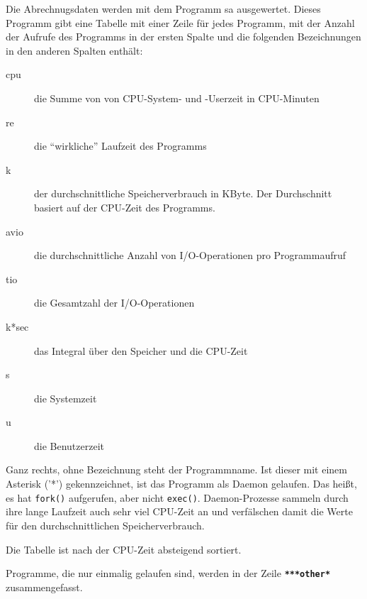 \begin{normaltext}
  Die Abrechnugsdaten werden mit dem Programm sa ausgewertet. Dieses Programm
  gibt eine Tabelle mit einer Zeile für jedes Programm, mit der Anzahl der
  Aufrufe des Programms in der ersten Spalte und die folgenden Bezeichnungen
  in den anderen Spalten enthält:
  \begin{description}
    \item[cpu] die Summe von von CPU-System- und -Userzeit in CPU-Minuten
    \item[re] die ``wirkliche'' Laufzeit des Programms
    \item[k] der durchschnittliche Speicherverbrauch in KByte. Der
      Durchschnitt basiert auf der CPU-Zeit des Programms.
    \item[avio] die durchschnittliche Anzahl von I/O-Operationen pro
      Programmaufruf
    \item[tio] die Gesamtzahl der I/O-Operationen
    \item[k*sec] das Integral über den Speicher und die CPU-Zeit
    \item[s] die Systemzeit
    \item[u] die Benutzerzeit
  \end{description}
  Ganz rechts, ohne Bezeichnung steht der Programmname.  
  Ist dieser mit einem Asterisk ('*') gekennzeichnet, ist das Programm als
  Daemon gelaufen. Das heißt, es hat \verb?fork()? aufgerufen, aber nicht
  \verb?exec()?. Daemon-Prozesse sammeln durch ihre lange Laufzeit auch sehr
  viel CPU-Zeit an und verfälschen damit die Werte für den durchschnittlichen
  Speicherverbrauch.

  Die Tabelle ist nach der CPU-Zeit absteigend sortiert.

  Programme, die nur einmalig gelaufen sind, werden in der Zeile {\bf
  \verb?***other*?} zusammengefasst.


\end{normaltext}
